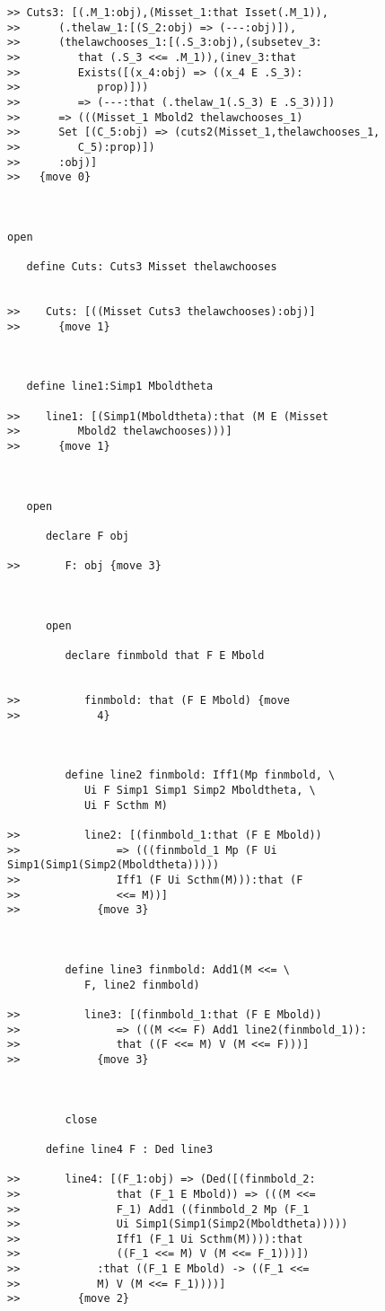 \documentclass[12pt]{article}
\begin{document}
\begin{verbatim}
>> Cuts3: [(.M_1:obj),(Misset_1:that Isset(.M_1)),
>>      (.thelaw_1:[(S_2:obj) => (---:obj)]),
>>      (thelawchooses_1:[(.S_3:obj),(subsetev_3:
>>         that (.S_3 <<= .M_1)),(inev_3:that
>>         Exists([(x_4:obj) => ((x_4 E .S_3):
>>            prop)]))
>>         => (---:that (.thelaw_1(.S_3) E .S_3))])
>>      => (((Misset_1 Mbold2 thelawchooses_1)
>>      Set [(C_5:obj) => (cuts2(Misset_1,thelawchooses_1,
>>         C_5):prop)])
>>      :obj)]
>>   {move 0}



open

   define Cuts: Cuts3 Misset thelawchooses


>>    Cuts: [((Misset Cuts3 thelawchooses):obj)]
>>      {move 1}



   define line1:Simp1 Mboldtheta

>>    line1: [(Simp1(Mboldtheta):that (M E (Misset
>>         Mbold2 thelawchooses)))]
>>      {move 1}



   open

      declare F obj

>>       F: obj {move 3}



      open

         declare finmbold that F E Mbold


>>          finmbold: that (F E Mbold) {move
>>            4}



         define line2 finmbold: Iff1(Mp finmbold, \
            Ui F Simp1 Simp1 Simp2 Mboldtheta, \
            Ui F Scthm M)

>>          line2: [(finmbold_1:that (F E Mbold))
>>               => (((finmbold_1 Mp (F Ui Simp1(Simp1(Simp2(Mboldtheta)))))
>>               Iff1 (F Ui Scthm(M))):that (F
>>               <<= M))]
>>            {move 3}



         define line3 finmbold: Add1(M <<= \
            F, line2 finmbold)

>>          line3: [(finmbold_1:that (F E Mbold))
>>               => (((M <<= F) Add1 line2(finmbold_1)):
>>               that ((F <<= M) V (M <<= F)))]
>>            {move 3}



         close

      define line4 F : Ded line3

>>       line4: [(F_1:obj) => (Ded([(finmbold_2:
>>               that (F_1 E Mbold)) => (((M <<=
>>               F_1) Add1 ((finmbold_2 Mp (F_1
>>               Ui Simp1(Simp1(Simp2(Mboldtheta)))))
>>               Iff1 (F_1 Ui Scthm(M)))):that
>>               ((F_1 <<= M) V (M <<= F_1)))])
>>            :that ((F_1 E Mbold) -> ((F_1 <<=
>>            M) V (M <<= F_1))))]
>>         {move 2}




\end{verbatim}
\end{document}

